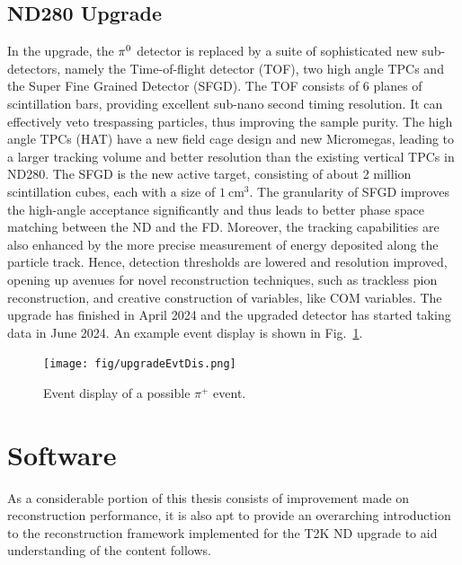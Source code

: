  
\subsection{\label{sec:ndup} ND280 Upgrade}
   In the upgrade, the $\pi^0$ detector is replaced by a suite of sophisticated new sub-detectors, namely the Time-of-flight detector (TOF), two high angle TPCs and the Super Fine Grained Detector (SFGD). 
   The TOF consists of 6 planes of scintillation bars, providing excellent sub-nano second timing resolution. 
   It can effectively veto trespassing particles, thus improving the sample purity.
   The high angle TPCs (HAT) have a new field cage design and new Micromegas, leading to a larger tracking volume and better resolution than the existing vertical TPCs in ND280. 
   The SFGD is the new active target, consisting of about 2 million scintillation cubes, each with a size of $1~\textrm{cm}^3$. 
   The granularity of SFGD improves the high-angle acceptance significantly and thus leads to better phase space matching between the ND and the FD. 
   Moreover, the tracking capabilities are also enhanced by the more precise measurement of energy deposited along the particle track. 
   Hence, detection thresholds are lowered and resolution improved, opening up avenues for novel reconstruction techniques, such as trackless pion reconstruction, and creative construction of variables, like COM variables. 
   The upgrade has finished in April 2024 and the upgraded detector has started taking data in June 2024. An example event display is shown in Fig.~\ref{fig:ndup-evedis}. 

    \begin{figure}[!htb]
        \centering
        \texttt{[image: fig/upgradeEvtDis.png]}
        \caption{Event display of a possible $\pi^+$ event.}
        \label{fig:ndup-evedis}
    \end{figure}

\section{Software}
  \label{sec:t2k-sw}
  As a considerable portion of this thesis consists of improvement made on reconstruction performance, it is also apt to provide an overarching introduction to the reconstruction framework implemented for the T2K ND upgrade to aid understanding of the content follows.

